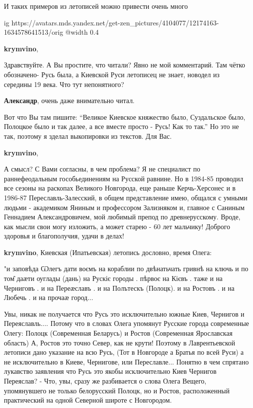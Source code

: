 \begin{itemize}
\begin{itemize}
И таких примеров из летописей можно привести очень много

\ifcmt
  ig https://avatars.mds.yandex.net/get-zen_pictures/4104077/12174163-1634578641513/orig
  @width 0.4
\fi

\textbf{krymvino}, 

Здравствуйте. А Вы простите, что читали? Явно не мой комментарий. Там чётко
обозначено- Русь была, а Киевской Руси летописец не знает, новодел из середины
19 века. Что тут непонятного?

\textbf{Александр}, очень даже внимательно читал.

Вот что Вы там пишите: \enquote{Великое Киевское княжество было, Суздальское было,
Полоцкое было и так далее, а все вместе просто - Русь! Как то так.} Но это не
так, поэтому я зделал выкопировки из текстов. Для Вас.

\textbf{krymvino}, 

А смысл? С Вами согласны, в чем проблема? Я не специалист по раннефеодальным
гособьединениям на Русской равнине. Но в 1984-85 проводил все сезоны на
раскопах Великого Новгорода, еще раньше Керчь-Херсонес и в 1986-87
Переславль-Залесский, в общем представление имею, общался с умными людьми -
академиком Яниным и профессором Зализняком и, главное с Саниным Геннадием
Александровичем, мой любимый препод по древнерусскому. Вроде, как мысли свои
могу изложить, а может старею - 60 лет мальчику! Доброго здоровья и
благополучия, удачи в делах!

\textbf{krymvino}, Киевская (Ипатьевская) летопись дословно, время Олега:

"и заповѣда Ѡлегъ дати воємъ на кораблии по двѣнатьчать гривнѣ на ключь и по
том̑ даӕти оуглады (дань) на Рускіє городы . пѣрвоє на Кієвъ . таже и на
Черниговъ . и на Переӕславъ . и на Полътескъ (Полоцк). и на Ростовъ . и на
Любечь . и на прочаӕ город...

Увы, никак не получается что Русь это исключительно южные Киев, Чернигов и
Переяславль.... Потому что в словах Олега упомянут Русские города современные
Олегу: Полоцк (Современная Беларусь) и Ростов (Современная Ярославская область)
А, Ростов это точно Север, как не крути! Поэтому в Лаврентьевской летописи дано
указание на всю Русь, (Тот в Новгороде а Братья по всей Руси) а не
исключительно в Киеве, Чернигове, или Переславле... Понятно в чем спрятано
лукавство заявления что Русь это якобы исключительно Киев Чернигов Переяслав? -
Что, увы, сразу же разбивается о слова Олега Вещего, упомянувшего не только
белорусский Полоцк, но и Ростов, расположенный практический на одной Северной
широте с Новгородом.


\end{itemize}
\end{itemize}
